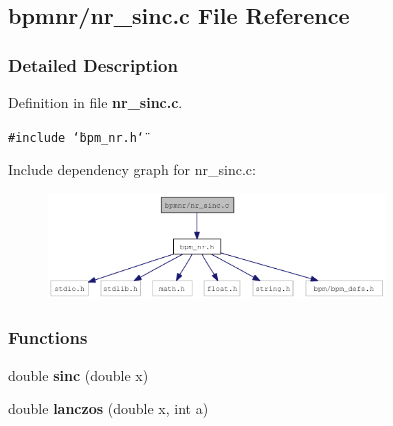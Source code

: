 \subsection{bpmnr/nr\_\-sinc.c File Reference}
\label{nr__sinc_8c}


\subsubsection{Detailed Description}


Definition in file {\bf nr\_\-sinc.c}.

{\tt \#include \char`\"{}bpm\_\-nr.h\char`\"{}}\par


Include dependency graph for nr\_\-sinc.c:\nopagebreak
\begin{figure}[H]
\begin{center}
\leavevmode
\includegraphics[width=253pt]{nr__sinc_8c__incl}
\end{center}
\end{figure}
\subsubsection*{Functions}
\begin{CompactItemize}
\item 
double {\bf sinc} (double x)
\item 
double {\bf lanczos} (double x, int a)
\end{CompactItemize}
